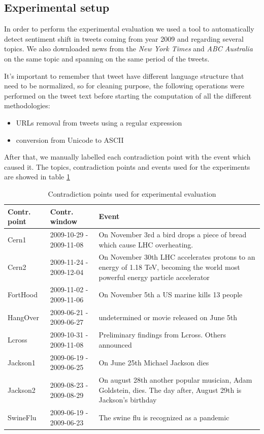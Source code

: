 \subsection*{Experimental setup}
In order to perform the experimental evaluation we used a tool to automatically
detect sentiment shift in tweets coming from year 2009 and regarding several
topics. We also downloaded news from the \emph{New York Times} and \emph{ABC
Australia} on the same topic and spanning on the same period of the tweets.

It's important to remember that tweet have different language structure that need to be normalized, so for cleaning purpose, the following operations were performed on the tweet text before starting the computation of all the different methodologies:
\begin{itemize}
	\item URLs removal from tweets using a regular expression
	\item conversion from Unicode to ASCII
\end{itemize}

After that, we manually labelled each contradiction point with the event which
caused it. The topics, contradiction points and events used for the experiments
are showed in table \ref{tab:setup}

\begin{table}
	\centering
	\begin{tabularx}{\textwidth}{|l|l|X|}
	\hline
	Contr. point 	& Contr. window 			& Event \\
	\hline 
	Cern1			& 2009-10-29 - 2009-11-08 	& On November 3rd a bird drops a
piece of bread which cause LHC overheating. \\
	Cern2			& 2009-11-24 - 2009-12-04	& On November 30th LHC accelerates protons to an
energy of 1.18 TeV, becoming the world most powerful energy particle
accelerator\\
	FortHood 		& 2009-11-02 - 2009-11-06	& On November 5th a US marine
kills 13 people\\
	HangOver		& 2009-06-21 - 2009-06-27	& undetermined or movie released
	on June 5th\\
	Lcross			& 2009-10-31 - 2009-11-08	& Preliminary findings from
	Lcross. Others announced\\
	Jackson1		& 2009-06-19 - 2009-06-25	& On June 25th Michael Jackson
dies\\
	Jackson2		& 2009-08-23 - 2009-08-29	& On august 28th another popular
musician, Adam Goldstein, dies. The day after, August 29th is Jackson's
birthday\\
	SwineFlu		& 2009-06-19 - 2009-06-23	& The swine flu is recognized as
	a pandemic\\
	\hline
	\end{tabularx}
	\caption{Contradiction points used for experimental evaluation}
	\label{tab:setup}
\end{table}

